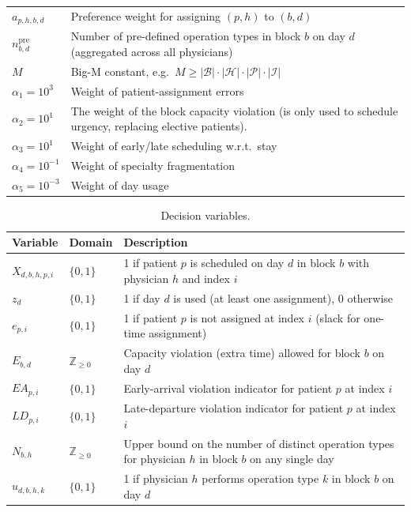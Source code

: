 \begin{table}[ht]
\begin{tabular*}{\textwidth}{@{\extracolsep{\fill}}ll}
$a_{p,h,b,d}$ & Preference weight for assigning $(p,h)$ to $(b,d)$\\
$n^{\text{pre}}_{b,d}$ & Number of pre-defined operation types in block $b$ on day $d$ (aggregated across all physicians)\\
$M$ & Big-M constant, e.g.\ $M \geq|\mathcal{B}|\cdot|\mathcal{H}|\cdot|\mathcal{P}|\cdot|\mathcal{I}|$\\
\midrule
$\alpha_1=10^3$ & Weight of patient-assignment errors \\
$\alpha_2=10^1$ & The weight of the block capacity violation (\scriptsize{is only used to schedule urgency, replacing elective patients)}.\\
$\alpha_3=10^1$ & Weight of early/late scheduling w.r.t.\ stay \\
$\alpha_4=10^{-1}$ & Weight of specialty fragmentation \\
$\alpha_5=10^{-3}$ & Weight of day usage \\
\bottomrule
\end{tabular*}
\end{table}

\begin{table}[ht]
\centering
\caption{Decision variables.}
\label{tab:variables}
\begin{tabular*}{\textwidth}{@{\extracolsep{\fill}}lll}
\toprule
\textbf{Variable} & \textbf{Domain} & \textbf{Description} \\
\midrule
$X_{d,b,h,p,i}$ & $\{0,1\}$ &
1 if patient $p$ is scheduled on day $d$ in block $b$ with physician $h$ and index $i$ \\
$z_d$ & $\{0,1\}$ &
1 if day $d$ is used (at least one assignment), 0 otherwise \\
$e_{p,i}$ & $\{0,1\}$ &
1 if patient $p$ is not assigned at index $i$ (slack for one-time assignment) \\
$E_{b,d}$ & $\mathbb{Z}_{\ge 0}$ &
Capacity violation (extra time) allowed for block $b$ on day $d$ \\
$EA_{p,i}$ & $\{0,1\}$ &
Early-arrival violation indicator for patient $p$ at index $i$ \\
$LD_{p,i}$ & $\{0,1\}$ &
Late-departure violation indicator for patient $p$ at index $i$ \\
$N_{b,h}$ & $\mathbb{Z}_{\ge 0}$ &
Upper bound on the number of distinct operation types for physician $h$ in block $b$ on any single day \\
$u_{d,b,h,k}$ & $\{0,1\}$ &
1 if physician $h$ performs operation type $k$ in block $b$ on day $d$ \\
\bottomrule
\end{tabular*}
\end{table}

